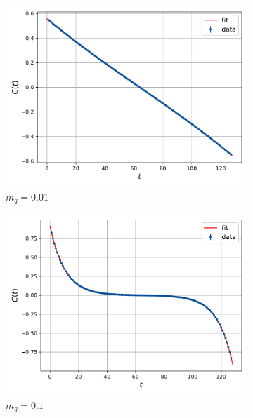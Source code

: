 \begin{figure}
    \centering
    \begin{subfigure}[b]{0.45\textwidth}
        \includegraphics[width=\textwidth]{figures/correlator/corrs_free/corr_small.pdf}
        \caption{$m_q = 0.01$}
    \end{subfigure}
    \hfill
    \begin{subfigure}[b]{0.45\textwidth}
        \includegraphics[width=\textwidth]{figures/correlator/corrs_free/corr_medium.pdf}
        \caption{$m_q = 0.1$}        
    \end{subfigure}
    \\
    \vspace{10pt}
    \begin{subfigure}[b]{0.45\textwidth}

\end{subfigure}
\end{figure}
